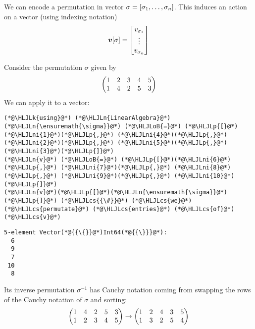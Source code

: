 We can encode a permutation in vector $\mathbf \ensuremath{\sigma} = [\ensuremath{\sigma}_1,\ensuremath{\ldots},\ensuremath{\sigma}_n]$.  This induces an action on a vector (using indexing notation)
\[
\bm{{\mbox{\boldmath$v$\unboldmath}}}[\mathbf \sigma] = \begin{bmatrix}v_{\sigma_1}\\ \vdots \\ v_{\sigma_n} \end{bmatrix}
\]
\begin{example}  Consider the permutation $\ensuremath{\sigma}$ given by
\[
\begin{pmatrix}
 1 & 2 & 3 & 4 & 5 \cr
 1 & 4 & 2 & 5 & 3
 \end{pmatrix}
\]
We can apply it to a vector:


\begin{lstlisting}
(*@\HLJLk{using}@*) (*@\HLJLn{LinearAlgebra}@*)
(*@\HLJLn{\ensuremath{\sigma}}@*) (*@\HLJLoB{=}@*) (*@\HLJLp{[}@*)(*@\HLJLni{1}@*)(*@\HLJLp{,}@*) (*@\HLJLni{4}@*)(*@\HLJLp{,}@*) (*@\HLJLni{2}@*)(*@\HLJLp{,}@*) (*@\HLJLni{5}@*)(*@\HLJLp{,}@*) (*@\HLJLni{3}@*)(*@\HLJLp{]}@*)
(*@\HLJLn{v}@*) (*@\HLJLoB{=}@*) (*@\HLJLp{[}@*)(*@\HLJLni{6}@*)(*@\HLJLp{,}@*) (*@\HLJLni{7}@*)(*@\HLJLp{,}@*) (*@\HLJLni{8}@*)(*@\HLJLp{,}@*) (*@\HLJLni{9}@*)(*@\HLJLp{,}@*) (*@\HLJLni{10}@*)(*@\HLJLp{]}@*)
(*@\HLJLn{v}@*)(*@\HLJLp{[}@*)(*@\HLJLn{\ensuremath{\sigma}}@*)(*@\HLJLp{]}@*) (*@\HLJLcs{{\#}}@*) (*@\HLJLcs{we}@*) (*@\HLJLcs{permutate}@*) (*@\HLJLcs{entries}@*) (*@\HLJLcs{of}@*) (*@\HLJLcs{v}@*)
\end{lstlisting}

\begin{lstlisting}
5-element Vector(*@{{\{}}@*)Int64(*@{{\}}}@*):
  6
  9
  7
 10
  8
\end{lstlisting}


Its inverse permutation $\ensuremath{\sigma}^{-1}$ has Cauchy notation coming from swapping the rows of the Cauchy notation of $\ensuremath{\sigma}$ and sorting:
\[
\begin{pmatrix}
 1 & 4 & 2 & 5 & 3 \cr
 1 & 2 & 3 & 4 & 5
 \end{pmatrix} \rightarrow \begin{pmatrix}
 1 & 2 & 4 & 3 & 5 \cr
 1 & 3 & 2 & 5 & 4
 \end{pmatrix} 
\]
\end{example}

